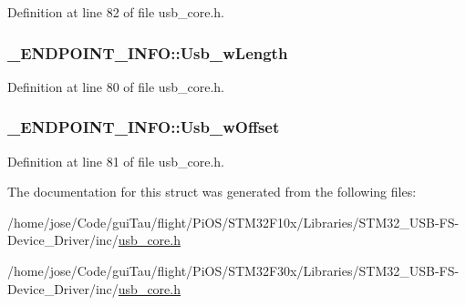 Definition at line 82 of file usb\-\_\-core.\-h.

\hypertarget{struct___e_n_d_p_o_i_n_t___i_n_f_o_a9d328b74992953d3fcacec35ae9fdac6}{
\subsubsection[{Usb\-\_\-w\-Length}]{ \-\_\-\-E\-N\-D\-P\-O\-I\-N\-T\-\_\-\-I\-N\-F\-O\-::\-Usb\-\_\-w\-Length}}\label{struct___e_n_d_p_o_i_n_t___i_n_f_o_a9d328b74992953d3fcacec35ae9fdac6}


Definition at line 80 of file usb\-\_\-core.\-h.

\hypertarget{struct___e_n_d_p_o_i_n_t___i_n_f_o_a4ba970c4d2750e7f6ddf1655dd06bf9e}{
\subsubsection[{Usb\-\_\-w\-Offset}]{ \-\_\-\-E\-N\-D\-P\-O\-I\-N\-T\-\_\-\-I\-N\-F\-O\-::\-Usb\-\_\-w\-Offset}}\label{struct___e_n_d_p_o_i_n_t___i_n_f_o_a4ba970c4d2750e7f6ddf1655dd06bf9e}


Definition at line 81 of file usb\-\_\-core.\-h.



The documentation for this struct was generated from the following files\-:\begin{DoxyCompactItemize}
\item 
/home/jose/\-Code/gui\-Tau/flight/\-Pi\-O\-S/\-S\-T\-M32\-F10x/\-Libraries/\-S\-T\-M32\-\_\-\-U\-S\-B-\/\-F\-S-\/\-Device\-\_\-\-Driver/inc/\hyperlink{_s_t_m32_f10x_2_libraries_2_s_t_m32___u_s_b-_f_s-_device___driver_2inc_2usb__core_8h}{usb\-\_\-core.\-h}\item 
/home/jose/\-Code/gui\-Tau/flight/\-Pi\-O\-S/\-S\-T\-M32\-F30x/\-Libraries/\-S\-T\-M32\-\_\-\-U\-S\-B-\/\-F\-S-\/\-Device\-\_\-\-Driver/inc/\hyperlink{_s_t_m32_f30x_2_libraries_2_s_t_m32___u_s_b-_f_s-_device___driver_2inc_2usb__core_8h}{usb\-\_\-core.\-h}\end{DoxyCompactItemize}
